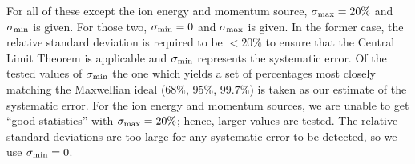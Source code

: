 \documentclass[12pt]{report}
\begin{document}
For all of these except the ion energy and momentum
source, $\sigma_{\rm max} = 20 \%$ and $\sigma_{\rm min}$ is given.
For those two, $\sigma_{\rm min} = 0$ and $\sigma_{\rm max}$ is given.
In the former case, the relative standard deviation is required to be
$< 20 \%$ to ensure that the Central Limit Theorem is applicable and
$\sigma_{\rm min}$ represents the systematic error. Of the tested
values of $\sigma_{\rm min}$ the one which yields a set of percentages
most closely matching the Maxwellian ideal ($68 \%$, $95 \%$, $99.7 \%$)
is taken as our estimate of the systematic error. For the ion energy
and momentum sources, we are unable to get ``good statistics'' with
$\sigma_{\rm max} = 20 \%$; hence, larger values are tested. The
relative standard deviations are too large for any systematic error
to be detected, so we use $\sigma_{\rm min} = 0$.
\end{document}
